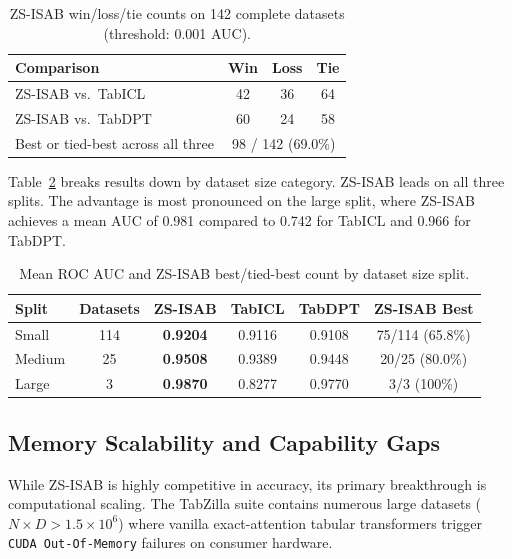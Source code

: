 \documentclass{article}
\begin{document}
\begin{table}[htbp]
\centering
\caption{ZS-ISAB win/loss/tie counts on 142 complete datasets (threshold: 0.001 AUC).}
\label{tab:wins}
\small
\begin{tabular}{@{}lccc@{}}
\toprule
\textbf{Comparison} & \textbf{Win} & \textbf{Loss} & \textbf{Tie} \\
\midrule
ZS-ISAB vs.\ TabICL & 42 & 36 & 64 \\
ZS-ISAB vs.\ TabDPT & 60 & 24 & 58 \\
\midrule
Best or tied-best across all three & \multicolumn{3}{c}{98 / 142 (69.0\%)} \\
\bottomrule
\end{tabular}
\end{table}

Table~\ref{tab:by_split} breaks results down by dataset size category. ZS-ISAB leads on all three splits. The advantage is most pronounced on the large split, where ZS-ISAB achieves a mean AUC of 0.981 compared to 0.742 for TabICL and 0.966 for TabDPT.

\begin{table}[htbp]
\centering
\caption{Mean ROC AUC and ZS-ISAB best/tied-best count by dataset size split.}
\label{tab:by_split}
\small
\begin{tabular}{@{}lccccc@{}}
\toprule
\textbf{Split} & \textbf{Datasets} & \textbf{ZS-ISAB} & \textbf{TabICL} & \textbf{TabDPT} & \textbf{ZS-ISAB Best} \\
\midrule
Small  & 114 & \textbf{0.9204} & 0.9116 & 0.9108 & 75/114 (65.8\%) \\
Medium & 25  & \textbf{0.9508} & 0.9389 & 0.9448 & 20/25 (80.0\%) \\
Large  & 3   & \textbf{0.9870} & 0.8277 & 0.9770 & 3/3 (100\%) \\
\bottomrule
\end{tabular}
\end{table}

\subsection{Memory Scalability and Capability Gaps}

While ZS-ISAB is highly competitive in accuracy, its primary breakthrough is computational scaling. The TabZilla suite contains numerous large datasets ($N \times D > 1.5 \times 10^6$) where vanilla exact-attention tabular transformers trigger \texttt{CUDA Out-Of-Memory} failures on consumer hardware. 
\end{document}
